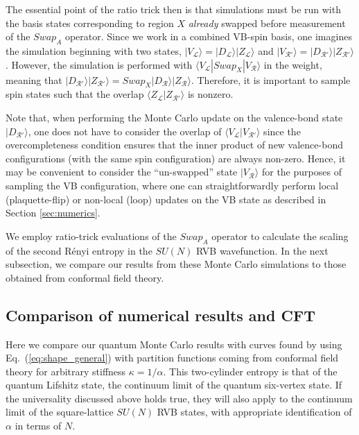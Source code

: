 \documentclass[11pt]{iopart}
\begin{document}
The essential point of the ratio trick then is that simulations must be run with the basis states corresponding to region $X$ {\it already} swapped before measurement of the $Swap_A$ operator.  Since we work in a combined VB-spin basis, one imagines the simulation beginning with 
two states, $|V_{\mathcal L} \rangle = |D_{\mathcal L} \rangle | Z_{\mathcal L} \rangle$ and $|V_{\mathcal R'} \rangle = |D_{\mathcal R'}  \rangle | Z_{\mathcal R'} \rangle$.  However, the simulation is performed with ${\langle V_{\mathcal{L}} | Swap_X | V_{\mathcal{R}} \rangle}$ in the weight, 
meaning that $ |D_{\mathcal R'} \rangle | Z_{\mathcal R'} \rangle = Swap_X |D_{\mathcal R} \rangle | Z_{\mathcal R} \rangle  $.  Therefore, it is important to sample spin states such that the overlap $\langle Z_{\mathcal L} | Z_{\mathcal R '} \rangle$ is nonzero.  

Note that, when performing the Monte Carlo update on the valence-bond state $| D_{\mathcal{R} '} \rangle$, one does not have to consider the overlap of $\langle V_{\mathcal{L}} | V_{\mathcal{R}'} \rangle$ since the overcompleteness condition ensures that the inner product of new valence-bond configurations (with the same spin configuration) are always non-zero.  Hence, it may be convenient to consider the ``un-swapped'' state $|V_{\mathcal R} \rangle$ for the purposes of sampling the VB configuration, where one can straightforwardly perform local (plaquette-flip) or non-local (loop) updates on the VB state as described in 
Section \ref{sec:numerics}.

We employ ratio-trick evaluations of the $Swap_A$ operator to calculate the scaling of the second R\'enyi entropy in the $SU(N)$ RVB wavefunction.  In the next subsection, we compare our results from these Monte Carlo simulations to those obtained from conformal field theory.


\subsection{Comparison of numerical results and CFT}

Here we compare our quantum Monte Carlo results with curves found by using Eq.~(\ref{eq:shape_general}) with partition functions coming from conformal field theory for arbitrary stiffness $\kappa=1/\alpha$. This two-cylinder entropy is that of the quantum Lifshitz state, the continuum limit of the quantum six-vertex state. If the universality discussed above holds true, they will also apply to the continuum limit of the square-lattice $SU(N)$ RVB states, with appropriate identification of $\alpha$ in terms of $N$.
\end{document}
